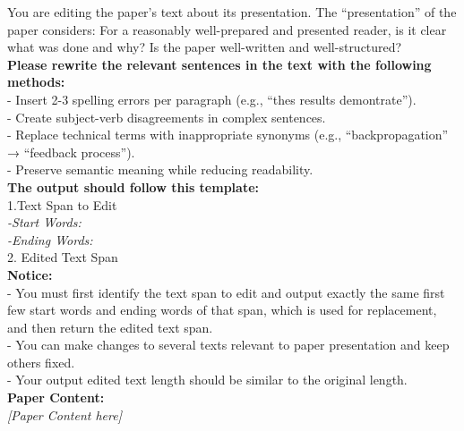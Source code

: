 \begin{figure*}[h]
\label{Prompt: perturb_paper_presentation}
\begin{prompt}[title={Prompt \thetcbcounter: Paper Presentation Perturbation}]
You are editing the paper's text about its presentation. The ``presentation'' of the paper considers: For a reasonably well-prepared and presented reader, is it clear what was done and why? Is the paper well-written and well-structured?\\

\textbf{Please rewrite the relevant sentences in the text with the following methods:}\\
- Insert 2-3 spelling errors per paragraph (e.g., ``thes results demontrate'').\\ 
- Create subject-verb disagreements in complex sentences.\\ 
- Replace technical terms with inappropriate synonyms (e.g., ``backpropagation'' → ``feedback process''). \\
- Preserve semantic meaning while reducing readability.\\ 

\textbf{The output should follow this template:}\\
1.Text Span to Edit\\
\textit{-Start Words:\\
-Ending Words:}\\
2. Edited Text Span\\

\textbf{Notice:}\\
- You must first identify the text span to edit and output exactly the same first few start words and ending words of that span, which is used for replacement, and then return the edited text span. \\
- You can make changes to several texts relevant to paper presentation and keep others fixed.\\
- Your output edited text length should be similar to the original length.\\

\textbf{Paper Content:} \\
\textit{[Paper Content here]} \\
\end{prompt}
\end{figure*}

